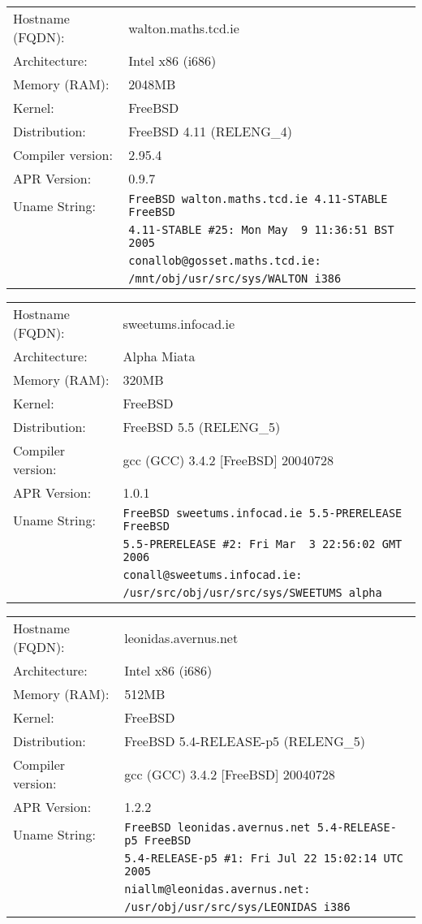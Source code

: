 \begin{tabular}{ll}
Hostname (FQDN):	&	walton.maths.tcd.ie 				\\
Architecture:		&	Intel x86 (i686)					\\
Memory (RAM):		&	2048MB								\\
Kernel:				&	FreeBSD								\\
Distribution:		&	FreeBSD 4.11 (RELENG\_4)		\\
Compiler version:	&	2.95.4								\\
APR Version:		&	0.9.7									\\
Uname String:		& \verb!FreeBSD walton.maths.tcd.ie 4.11-STABLE FreeBSD! \\
						& \verb!4.11-STABLE #25: Mon May  9 11:36:51 BST 2005! \\ 
						& \verb!conallob@gosset.maths.tcd.ie:! \\ 
						& \verb!/mnt/obj/usr/src/sys/WALTON i386! \\
\end{tabular}

\begin{tabular}{ll}
Hostname (FQDN):	&	sweetums.infocad.ie 				\\
Architecture:		&	Alpha Miata							\\
Memory (RAM):		&	320MB									\\
Kernel:				&	FreeBSD								\\
Distribution:		&	FreeBSD 5.5 (RELENG\_5)			\\
Compiler version:	&	gcc (GCC) 3.4.2 [FreeBSD] 20040728\\
APR Version:		&	1.0.1									\\
Uname String:		& \verb!FreeBSD sweetums.infocad.ie 5.5-PRERELEASE FreeBSD!\\
						& \verb!5.5-PRERELEASE #2: Fri Mar  3 22:56:02 GMT 2006! \\
						& \verb!conall@sweetums.infocad.ie:! \\
						&	\verb!/usr/src/obj/usr/src/sys/SWEETUMS alpha!\\
\end{tabular}

\begin{tabular}{ll}
Hostname (FQDN):	&	leonidas.avernus.net				\\
Architecture:		&	Intel x86 (i686)					\\
Memory (RAM):		&	512MB									\\
Kernel:				&	FreeBSD								\\
Distribution:		&	FreeBSD 5.4-RELEASE-p5 (RELENG\_5)			\\
Compiler version:	&	gcc (GCC) 3.4.2 [FreeBSD] 20040728\\
APR Version:		&	1.2.2									\\
Uname String:		&	\verb!FreeBSD leonidas.avernus.net 5.4-RELEASE-p5 FreeBSD! \\ 
						&	\verb!5.4-RELEASE-p5 #1: Fri Jul 22 15:02:14 UTC 2005! \\
						& 	\verb!niallm@leonidas.avernus.net:! \\
						&	\verb!/usr/obj/usr/src/sys/LEONIDAS i386!

\end{tabular}

